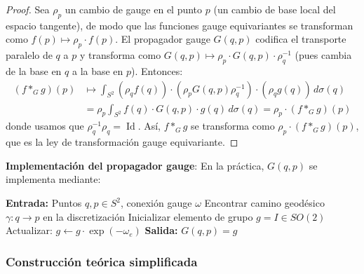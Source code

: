 \begin{proof}
Sea $\rho_p$ un cambio de gauge en el punto $p$ (un cambio de base local del espacio tangente), de modo que las funciones gauge equivariantes se transforman como $f(p) \mapsto \rho_p \cdot f(p)$. El propagador gauge $G(q,p)$ codifica el transporte paralelo de $q$ a $p$ y transforma como $G(q,p) \mapsto \rho_p \cdot G(q,p) \cdot \rho_q^{-1}$ (pues cambia de la base en $q$ a la base en $p$). Entonces:
\begin{align}
(f *_G g)(p) &\mapsto \int_{S^2} (\rho_q f(q)) \cdot (\rho_p G(q,p) \rho_q^{-1}) \cdot (\rho_q g(q)) \, d\sigma(q) \\
&= \rho_p \int_{S^2} f(q) \cdot G(q,p) \cdot g(q) \, d\sigma(q) = \rho_p \cdot (f *_G g)(p)
\end{align}
donde usamos que $\rho_q^{-1} \rho_q = \operatorname{Id}$. Así, $f *_G g$ se transforma como $\rho_p \cdot (f *_G g)(p)$, que es la ley de transformación gauge equivariante.
\end{proof}

\textbf{Implementación del propagador gauge}: En la práctica, $G(q,p)$ se implementa mediante:

\begin{algorithm}[H]
\caption{Cálculo del Propagador Gauge Icosaédrico}
\begin{algorithmic}[1]
    \State \textbf{Entrada:} Puntos $q, p \in S^2$, conexión gauge $\omega$
    \State Encontrar camino geodésico $\gamma: q \to p$ en la discretización
    \State Inicializar elemento de grupo $g = I \in SO(2)$
        \State Actualizar: $g \leftarrow g \cdot \exp(-\omega_e)$
    \EndFor
    \State \textbf{Salida:} $G(q,p) = g$
\end{algorithmic}
\end{algorithm}

\subsubsection{Construcción teórica simplificada}

